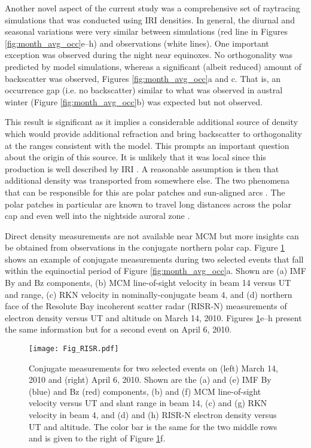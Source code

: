 Another novel aspect of the current study was a comprehensive set of raytracing simulations that was conducted using IRI densities. In general, the diurnal and seasonal variations were very similar between simulations (red line in Figures \ref{fig:month_avg_occ}e--h) and observations (white lines). One important exception was observed during the night near equinoxes. No orthogonality was predicted by model simulations, whereas a significant (albeit reduced) amount of backscatter was observed, Figures \ref{fig:month_avg_occ}a and c. That is, an occurrence gap (i.e. no backscatter) similar to what was observed in austral winter (Figure \ref{fig:month_avg_occ}b) was expected but not observed.



This result is significant as it implies a considerable additional source of density which would provide additional refraction and bring backscatter to orthogonality at the ranges consistent with the model. This prompts an important question about the origin of this source. It is unlikely that it was local since this production is well described by IRI \citep[e.g.][]{Themens2014}. A reasonable assumption is then that additional density was transported from somewhere else. The two phenomena that can be responsible for this are polar patches \citep{Weber1984} and sun-aligned arcs \citep{Valladares1994}. The polar patches in particular are known to travel long distances across the polar cap and even well into the nightside auroral zone \citep{Moen2007,Oksavik2010}.

Direct density measurements are not available near MCM but more insights can be obtained from observations in the conjugate northern polar cap. Figure \ref{fig:patchy_example} shows an example of conjugate measurements during two selected events that fall within the equinoctial period of Figure \ref{fig:month_avg_occ}a. Shown are (a) IMF By and Bz components, (b) MCM line-of-sight velocity in beam 14 versus UT and range, (c) RKN velocity in nominally-conjugate beam 4, and (d) northern face of the Resolute Bay incoherent scatter radar (RISR-N) measurements of electron density versus UT and altitude on March 14, 2010. Figures \ref{fig:patchy_example}e--h present the same information but for a second event on April 6, 2010.

\begin{figure}
\texttt{[image: Fig\_RISR.pdf]}
\caption{Conjugate measurements for two selected events on (left) March 14, 2010 and (right) April 6, 2010. Shown are the (a) and (e) IMF By (blue) and Bz (red) components, (b) and (f) MCM line-of-sight velocity versus UT and slant range in beam 14, (c) and (g) RKN velocity in beam 4, and (d) and (h) RISR-N electron density versus UT and altitude. The color bar is the same for the two middle rows and is given to the right of Figure \ref{fig:patchy_example}f.}
\label{fig:patchy_example}
\end{figure}


